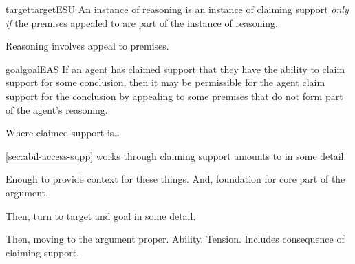 \begin{note}
  \begin{restatable}[\ESU{-} --- \ESU{}]{target}{targetESU}
    \label{denied-claim}
    An instance of reasoning is an instance of claiming support \emph{only if} the premises appealed to are part of the instance of reasoning.
  \end{restatable}
  {\color{red} Reasoning involves appeal to premises.}
\end{note}

\begin{note}
  \begin{restatable}[\EAS{-} --- \EAS{}]{goal}{goalEAS}
    \label{prop:EAS}
    If an agent has claimed support that they have the ability to claim support for some conclusion, then it may be permissible for the agent claim support for the conclusion by appealing to some premises that do not form part of the agent's reasoning.
  \end{restatable}
\end{note}

\begin{note}
  Where claimed support is\dots
\end{note}

\begin{note}
  \autoref{sec:abil-access-supp} works through claiming support amounts to in some detail.

  Enough to provide context for these things.
  And, foundation for core part of the argument.

  Then, turn to target and goal in some detail.

  Then, moving to the argument proper.
  Ability.
  Tension.
  Includes consequence of claiming support.
\end{note}

